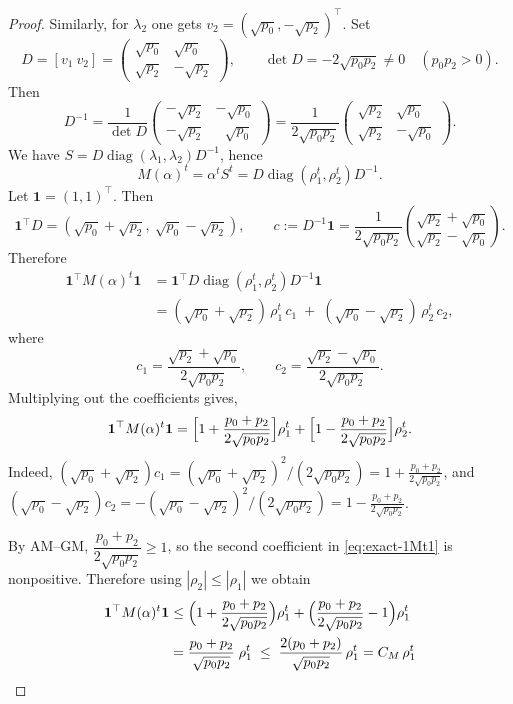 \documentclass[11pt,reqno]{amsart}
\numberwithin{equation}{section}
\newcommand{\diag}{\operatorname{diag}}
\begin{document}
\begin{proof}
	Similarly, for $\lambda_2$ one gets $v_2=(\sqrt{p_0},-\sqrt{p_2})^\top$.
	Set
	\[
	D=[v_1\ v_2]=
	\begin{pmatrix}
		\sqrt{p_0}&\sqrt{p_0}\\
		\sqrt{p_2}&-\sqrt{p_2}
	\end{pmatrix},
	\qquad
	\det D=-2\sqrt{p_0p_2}\neq 0\quad(p_0p_2>0).
	\]
	Then
	\[
	D^{-1}
	=\frac{1}{\det D}
	\begin{pmatrix}
		-\sqrt{p_2}&-\sqrt{p_0}\\
		-\sqrt{p_2}&\ \ \ \sqrt{p_0}
	\end{pmatrix}
	=\frac{1}{2\sqrt{p_0p_2}}
	\begin{pmatrix}
		\sqrt{p_2}&\sqrt{p_0}\\
		\sqrt{p_2}&-\sqrt{p_0}
	\end{pmatrix}.
	\]
	We have $S=D\diag(\lambda_1,\lambda_2)D^{-1}$, hence
	\[
	M(\alpha)^t
	=\alpha^t S^t
	=D\diag(\rho_1^t,\rho_2^t)D^{-1}.
	\]
	Let $\mathbf{1}=(1,1)^\top$.
	Then
	\[
	\mathbf{1}^\top D=(\sqrt{p_0}+\sqrt{p_2},\ \sqrt{p_0}-\sqrt{p_2}),\qquad
	c:=D^{-1}\mathbf{1}
	=\frac{1}{2\sqrt{p_0p_2}}
	\binom{\sqrt{p_2}+\sqrt{p_0}}{\sqrt{p_2}-\sqrt{p_0}}.
	\]
	Therefore
	\begin{align*}
		\mathbf{1}^\top M(\alpha)^t\mathbf{1}
		&=\mathbf{1}^\top D \diag(\rho_1^t,\rho_2^t)D^{-1}\mathbf{1}\\
		&=(\sqrt{p_0}+\sqrt{p_2})\,\rho_1^t\,c_1\;+\;(\sqrt{p_0}-\sqrt{p_2})\,\rho_2^t\,c_2,
	\end{align*}
	where
	\[
	c_1=\frac{\sqrt{p_2}+\sqrt{p_0}}{2\sqrt{p_0p_2}},\qquad
	c_2=\frac{\sqrt{p_2}-\sqrt{p_0}}{2\sqrt{p_0p_2}}.
	\]
	Multiplying out the coefficients gives,
	\begin{equation}\label{eq:exact-1Mt1}
		\mathbf{1}^\top M(\alpha)^t\mathbf{1}
		=\Bigl[1+\frac{p_0+p_2}{2\sqrt{p_0p_2}}\Bigr]\rho_1^t
		+\Bigl[1-\frac{p_0+p_2}{2\sqrt{p_0p_2}}\Bigr]\rho_2^t.
	\end{equation}
	Indeed, $(\sqrt{p_0}+\sqrt{p_2})c_1=(\sqrt{p_0}+\sqrt{p_2})^2/(2\sqrt{p_0p_2})
	=1+\frac{p_0+p_2}{2\sqrt{p_0p_2}}$, and
	$(\sqrt{p_0}-\sqrt{p_2})c_2=-(\sqrt{p_0}-\sqrt{p_2})^2/(2\sqrt{p_0p_2})
	=1-\frac{p_0+p_2}{2\sqrt{p_0p_2}}$.
	
	By AM–GM, $\dfrac{p_0+p_2}{2\sqrt{p_0p_2}}\ge 1$, so the second coefficient in \eqref{eq:exact-1Mt1} is nonpositive.
	Therefore using $|\rho_2|\le |\rho_1|$ we obtain
	\begin{align*}
		\mathbf{1}^\top M(\alpha)^t\mathbf{1}
		&\le
		\Bigl(1+\frac{p_0+p_2}{2\sqrt{p_0p_2}}\Bigr)\rho_1^t
		+\Bigl(\frac{p_0+p_2}{2\sqrt{p_0p_2}}-1\Bigr)\rho_1^t\\
		&=\frac{p_0+p_2}{\sqrt{p_0p_2}}\;\rho_1^t
		\;\le\; \frac{2(p_0+p_2)}{\sqrt{p_0p_2}}\,\rho_1^t =C_M\,\rho_1^t
	\end{align*}
\end{proof}
\end{document}

